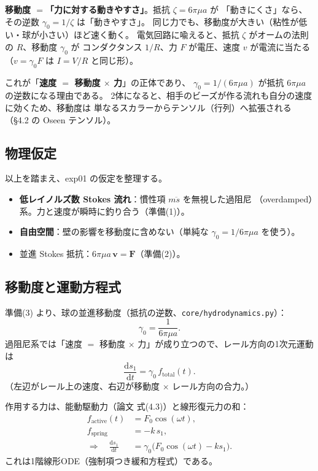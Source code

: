 \documentclass[11pt,a4paper]{article}
\newcommand{\Fv}{\bm{F}}
\newcommand{\gamz}{\gamma_{0}}
\newcommand{\dd}{\mathrm{d}}
\begin{document}
\begin{keybox}
\textbf{移動度 $=$「力に対する動きやすさ」}。抵抗 $\zeta=6\pi\mu a$ が
「動きにくさ」なら、その逆数 $\gamz=1/\zeta$ は「動きやすさ」。
同じ力でも、移動度が大きい（粘性が低い・球が小さい）ほど速く動く。
電気回路に喩えると、抵抗 $\zeta$ がオームの法則の $R$、移動度 $\gamz$ が
コンダクタンス $1/R$、力 $F$ が電圧、速度 $v$ が電流に当たる
（$v=\gamz F$ は $I=V/R$ と同じ形）。
\end{keybox}

これが「\textbf{速度 $=$ 移動度 $\times$ 力}」の正体であり、
$\gamz=1/(6\pi\mu a)$ が抵抗 $6\pi\mu a$ の逆数になる理由である。
2体になると、相手のビーズが作る流れも自分の速度に効くため、移動度は
単なるスカラーからテンソル（行列）へ拡張される（§4.2 の Oseen テンソル）。

\subsection{物理仮定}

以上を踏まえ、exp01 の仮定を整理する。

\begin{itemize}
\item \textbf{低レイノルズ数 Stokes 流れ}：慣性項 $m\ddot s$ を無視した過阻尼
（overdamped）系。力と速度が瞬時に釣り合う（準備(1)）。
\item \textbf{自由空間}：壁の影響を移動度に含めない（単純な $\gamz=1/6\pi\mu a$ を使う）。
\item 並進 Stokes 抵抗：$6\pi\mu a\,\bm v=\Fv$（準備(2)）。
\end{itemize}

\subsection{移動度と運動方程式}

準備(3) より、球の並進移動度（抵抗の逆数、\texttt{core/hydrodynamics.py}）：
\begin{equation}
\gamz=\frac{1}{6\pi\mu a}.
\end{equation}
過阻尼系では「速度 $=$ 移動度 $\times$ 力」が成り立つので、レール方向の1次元運動は
\begin{equation}
\frac{\dd s_1}{\dd t}=\gamz\,f_{\mathrm{total}}(t).
\end{equation}
（左辺がレール上の速度、右辺が移動度 $\times$ レール方向の合力。）

作用する力は、能動駆動力（論文 式(4.3)）と線形復元力の和：
\begin{align}
f_{\mathrm{active}}(t)&=F_0\cos(\omega t),\\
f_{\mathrm{spring}}&=-k\,s_1,\\
\Rightarrow\quad
\frac{\dd s_1}{\dd t}&=\gamz\big(F_0\cos(\omega t)-k s_1\big).
\end{align}
これは1階線形ODE（強制項つき緩和方程式）である。
\end{document}
